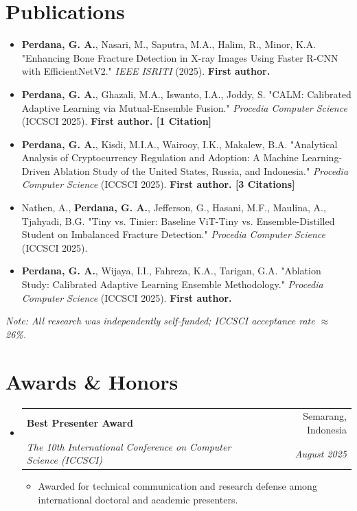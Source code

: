 \documentclass[letterpaper,11pt]{article}
\makeatletter
\newcommand{\resumeItem}[1]{
  \item\small{
    {#1 \vspace{-2pt}}
  }
}
\newcommand{\resumeSubheading}[4]{
  \vspace{-2pt}\item
    \begin{tabular*}{0.97\textwidth}[t]{l@{\extracolsep{\fill}}r}
      \textbf{#1} & #2 \\
      \textit{\small#3} & \textit{\small #4} \\
    \end{tabular*}\vspace{-7pt}
}
\newcommand{\resumeSubHeadingListStart}{\begin{itemize}[leftmargin=0.15in, label={}]}
\newcommand{\resumeSubHeadingListEnd}{\end{itemize}}
\newcommand{\resumeItemListStart}{\begin{itemize}}
\newcommand{\resumeItemListEnd}{\end{itemize}\vspace{-5pt}}
\makeatother
\begin{document}
\section{\textbf{Publications}}
\resumeItemListStart
  \resumeItem {\textbf{Perdana, G. A.}, Nasari, M., Saputra, M.A., Halim, R., Minor, K.A. "Enhancing Bone Fracture Detection in X-ray Images Using Faster R-CNN with EfficientNetV2." \textit{IEEE ISRITI} (2025). \textbf{First author.}}
  \vspace{-1.5ex}
  \resumeItem {\textbf{Perdana, G. A.}, Ghazali, M.A., Iswanto, I.A., Joddy, S. "CALM: Calibrated Adaptive Learning via Mutual-Ensemble Fusion." \textit{Procedia Computer Science} (ICCSCI 2025). \textbf{First author. [1 Citation]}}
  \vspace{-1.5ex}
  \resumeItem {\textbf{Perdana, G. A.}, Kisdi, M.I.A., Wairooy, I.K., Makalew, B.A. "Analytical Analysis of Cryptocurrency Regulation and Adoption: A Machine Learning-Driven Ablation Study of the United States, Russia, and Indonesia." \textit{Procedia Computer Science} (ICCSCI 2025). \textbf{First author. [3 Citations]}}
  \vspace{-1.5ex}
  \resumeItem {Nathen, A., \textbf{Perdana, G. A.}, Jefferson, G., Hasani, M.F., Maulina, A., Tjahyadi, B.G. "Tiny vs. Tinier: Baseline ViT-Tiny vs. Ensemble-Distilled Student on Imbalanced Fracture Detection." \textit{Procedia Computer Science} (ICCSCI 2025).}
  \vspace{-1.5ex}
  \resumeItem {\textbf{Perdana, G. A.}, Wijaya, I.I., Fahreza, K.A., Tarigan, G.A. "Ablation Study: Calibrated Adaptive Learning Ensemble Methodology." \textit{Procedia Computer Science} (ICCSCI 2025). \textbf{First author.}}
\resumeItemListEnd
\textit{Note: All research was independently self-funded; ICCSCI acceptance rate $\approx$26\%.}
\vspace{-1.5ex}

\section{\textbf{Awards \& Honors}}
  \resumeSubHeadingListStart
    \resumeSubheading
      {Best Presenter Award}{Semarang, Indonesia}
      {The 10th International Conference on Computer Science (ICCSCI)}{August 2025}
      \resumeItemListStart
        \resumeItem{Awarded for technical communication and research defense among international doctoral and academic presenters.}
      \resumeItemListEnd
  \resumeSubHeadingListEnd
\vspace{-2ex}
\end{document}
